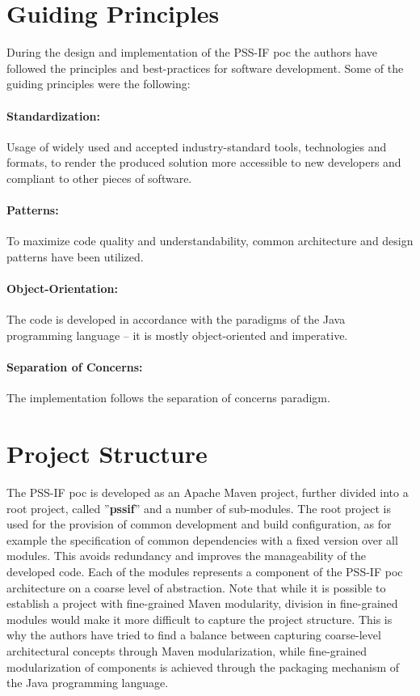 \section{Guiding Principles}
\label{sec:impl:principles}

During the design and implementation of the PSS-IF \gls{poc} the authors have followed the principles and best-practices for software development. Some of the guiding principles were the following:

\paragraph{Standardization:} Usage of widely used and accepted industry-standard tools, technologies and formats, to render the produced solution more accessible to new developers and compliant to other pieces of software.

\paragraph{Patterns:} To maximize code quality and understandability, common architecture and design patterns have been utilized.

\paragraph{Object-Orientation:} The code is developed in accordance with the paradigms of the Java programming language -- it is mostly object-oriented and imperative.

\paragraph{Separation of Concerns:} The implementation follows the separation of concerns paradigm.

\section{Project Structure}
\label{sec:impl:structure}

The PSS-IF \gls{poc} is developed as an Apache Maven project, further divided into a root project, called ''\textbf{pssif}'' and a number of sub-modules. The root project is used for the provision of common development and  build configuration, as for example the specification of common dependencies with a fixed version over all modules. This avoids redundancy and improves the manageability of the developed code. Each of the modules represents a component of the PSS-IF \gls{poc} architecture on a coarse level of abstraction. Note that while it is possible to establish a project with fine-grained Maven modularity, division in fine-grained modules would make it more difficult to capture the project structure. This is why the authors have tried to find a balance between capturing coarse-level architectural concepts through Maven modularization, while fine-grained modularization of components is achieved through the packaging mechanism of the Java programming language.

